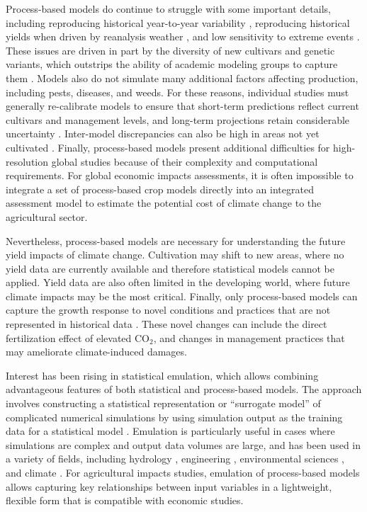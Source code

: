 \documentclass[esd, manuscript]{copernicus} %
\begin{document}
Process-based models do continue to struggle with some important details, including reproducing historical year-to-year variability \citep[e.g.][]{muller_global_2017}, reproducing historical yields when driven by reanalysis weather \citep[e.g.][]{Glotter14}, and low sensitivity to extreme events \citep[e.g.][]{Glotter15, Jag2018, schewe2019}. These issues are driven in part by the diversity of new cultivars and genetic variants, which outstrips the ability of academic modeling groups to capture them \citep[e.g.][]{JONES2017b}. Models also do not simulate many additional factors affecting production, including pests, diseases, and weeds. For these reasons, individual studies must generally re-calibrate models to ensure that short-term predictions reflect current cultivars and management levels, and long-term projections retain considerable uncertainty \citep{WOLF2002217, JAGTAP200273, Iizumi2010, ANGULO201332, Asseng2013, Asseng2015}. Inter-model discrepancies can also be high in areas not yet cultivated \citep[e.g.][]{Challinor2014, WHITE2011357}. Finally, process-based models present additional difficulties for high-resolution global studies because of their complexity and computational requirements. For global economic impacts assessments, it is often impossible to integrate a set of process-based crop models directly into an integrated assessment model to estimate the potential cost of climate change to the agricultural sector.

Nevertheless, process-based models are necessary for understanding the future yield impacts of climate change. Cultivation may shift to new areas, where no yield data are currently available and therefore statistical models cannot be applied. Yield data are also often limited in the developing world, where future climate impacts may be the most critical. Finally, only process-based models can capture the growth response to novel conditions and practices that are not represented in historical data \citep[e.g.][]{pugh_climate_2016, Roberts2017}. These novel changes can include the direct fertilization effect of elevated CO$_2$, and changes in management practices that may ameliorate climate-induced damages.

Interest has been rising in statistical emulation, which allows combining advantageous features of both statistical and process-based models. The approach involves constructing a statistical representation or ``surrogate model'' of complicated numerical simulations by using simulation output as the training data for a statistical model \citep[e.g.][]{OHAGAN2006, OHAGAN2010}. Emulation is particularly useful in cases where simulations are complex and output data volumes are large,  and  has been used in a variety of fields, including hydrology \citep[e.g.][]{Razavi2012}, engineering \citep[e.g.][]{STORLIE2009}, environmental sciences \citep[e.g.][]{RATTO2012}, and climate \citep[e.g.][]{Castruccio14, Holden2014}. For agricultural impacts studies, emulation of process-based models allows capturing key relationships between input variables in a lightweight, flexible form that is compatible with economic studies. 
\end{document}

